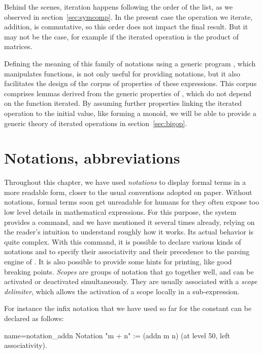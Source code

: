 Behind the scenes, iteration happens following the order of the list,
as we observed in section~\ref{sec:symcomp}.
In the present case the operation we iterate, addition, is
commutative, so this order does not impact the final result. But it
may not be the case, for example if the iterated operation
is the product of matrices.

Defining the meaning of this family of notations using a generic
program , which manipulates functions, is not only useful for
providing notations, but it also facilitates the design of the
corpus of properties of these expressions. This corpus comprises
lemmas derived from the generic properties of , which do not
depend on the function iterated. By assuming further properties
linking the iterated operation to the initial value, like forming a
monoid, we will be able to provide a generic theory of iterated
operations in section~\ref{sec:bigop}.

\section{Notations, abbreviations}\label{sec:notabrev}

Throughout this chapter, we have used \emph{notations} to display
formal terms in a more readable form, closer to the usual conventions
adopted on paper. Without notations, formal terms soon get unreadable for
humans for they often expose too low level details in mathematical
expressions. For this purpose, the \Coq{} system provides a
 command, and we have mentioned it several times already,
relying on the reader's intuition to understand roughly how it
works. Its actual behavior is quite complex. With this command, it is
possible to declare various kinds of notations and to specify their
associativity and their precedence to the parsing engine of \Coq{}. It
is also possible to provide some hints for printing, like good
breaking points. {\em Scopes} are groups of notation that go together
well, and can be activated or deactivated simultaneously. They are
usually associated with a {\em scope delimiter}, which allows the
activation of a scope locally in a sub-expression.

For instance the infix notation that we have used so far for the
constant  can be declared as follows:

\begin{coq}{name=notation_addn}{}
Notation "m + n" := (addn m n) (at level 50, left associativity).
\end{coq}

